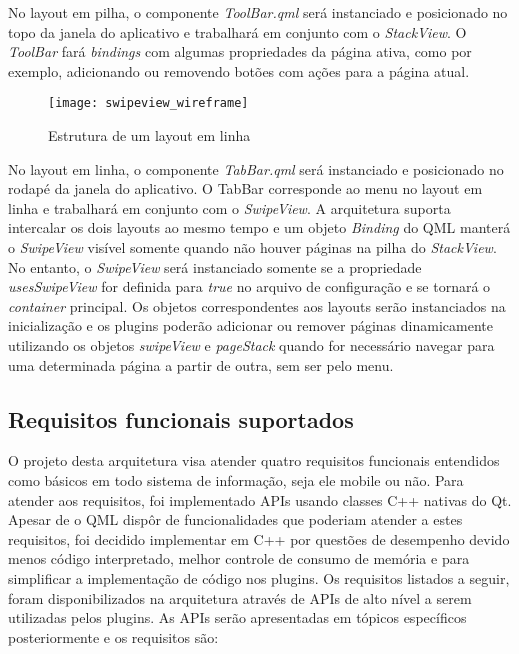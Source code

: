 No layout em pilha, o componente \textit{ToolBar.qml} será instanciado e posicionado no topo da janela do aplicativo e trabalhará em conjunto com o \textit{StackView}. O \textit{ToolBar} fará \textit{bindings} com algumas propriedades da página ativa, como por exemplo, adicionando ou removendo botões com ações para a página atual.

\begin{figure}[H]
	\texttt{[image: swipeview\_wireframe]}
	\centering
	\caption{Estrutura de um layout em linha}
\end{figure}

No layout em linha, o componente \textit{TabBar.qml} será instanciado e posicionado no rodapé da janela do aplicativo. O TabBar corresponde ao menu no layout em linha e trabalhará em conjunto com o \textit{SwipeView}. A arquitetura suporta intercalar os dois layouts ao mesmo tempo e um objeto \textit{Binding} do QML manterá o \textit{SwipeView} visível somente quando não houver páginas na pilha do \textit{StackView}. No entanto, o \textit{SwipeView} será instanciado somente se a propriedade \textit{usesSwipeView} for definida para \textit{true} no arquivo de configuração e se tornará o \textit{container} principal. Os objetos correspondentes aos layouts serão instanciados na inicialização e os plugins poderão adicionar ou remover páginas dinamicamente utilizando os objetos \textit{swipeView} e \textit{pageStack} quando for necessário navegar para uma determinada página a partir de outra, sem ser pelo menu.\par


\subsection{Requisitos funcionais suportados}
O projeto desta arquitetura visa atender quatro requisitos funcionais entendidos como básicos em todo sistema de informação, seja ele mobile ou não. Para atender aos requisitos, foi implementado APIs usando classes C++ nativas do Qt. Apesar de o QML dispôr de funcionalidades que poderiam atender a estes requisitos, foi decidido implementar em C++ por questões de desempenho devido menos código interpretado, melhor controle de consumo de memória e para simplificar a implementação de código nos plugins. Os requisitos listados a seguir, foram disponibilizados na arquitetura através de APIs de alto nível a serem utilizadas pelos plugins. As APIs serão apresentadas em tópicos específicos posteriormente e os requisitos são:

